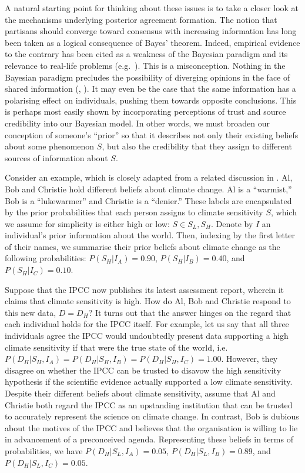 \documentclass[smallextended]{svjour3}       %
\begin{document}
A natural starting point for thinking about these issues is to take a
closer look at the mechanisms underlying posterior agreement formation.
The notion that partisans should converge toward consensus with
increasing information has long been taken as a logical consequence of
Bayes' theorem. Indeed, empirical evidence to the contrary has been
cited as a weakness of the Bayesian paradigm and its relevance to
real-life problems (e.g.~\cite{kahneman1972subjective}). This is a
misconception. Nothing in the Bayesian paradigm precludes the
possibility of diverging opinions in the face of shared information
(\cite{jaynes2003probability}, \cite{bullock2009partisan}). It may even
be the case that the same information has a polarising effect on
individuals, pushing them towards opposite conclusions. This is perhaps
most easily shown by incorporating perceptions of trust and source
credibility into our Bayesian model. In other words, we must broaden our
conception of someone's ``prior'' so that it describes not only their
existing beliefs about some phenomenon \(S\), but also the credibility
that they assign to different sources of information about \(S\).

Consider an example, which is closely adapted from a related discussion
in \cite{jaynes2003probability}. Al, Bob and Christie hold different
beliefs about climate change. Al is a ``warmist,'' Bob is a
``lukewarmer'' and Christie is a ``denier.'' These labels are
encapsulated by the prior probabilities that each person assigns to
climate sensitivity \(S\), which we assume for simplicity is either high
or low: \(S \in {S_L, S_H}\). Denote by \(I\) an individual's prior
information about the world. Then, indexing by the first letter of their
names, we summarise their prior beliefs about climate change as the
following probabilities: \(P(S_H|I_A)=0.90\), \(P(S_H|I_B)=0.40\), and
\(P(S_H|I_C)=0.10\).

Suppose that the IPCC now publishes its latest assessment report,
wherein it claims that climate sensitivity is high. How do Al, Bob and
Christie respond to this new data, \(D=D_H\)? It turns out that the
answer hinges on the regard that each individual holds for the IPCC
itself. For example, let us say that all three individuals agree the
IPCC would undoubtedly present data supporting a high climate
sensitivity if that were the true state of the world,
i.e.~\(P(D_H|S_H,I_A) = P(D_H|S_H,I_B) = P(D_H|S_H,I_C) = 1.00\).
However, they disagree on whether the IPCC can be trusted to disavow the
high sensitivity hypothesis if the scientific evidence actually
supported a low climate sensitivity. Despite their different beliefs
about climate sensitivity, assume that Al and Christie both regard the
IPCC as an upstanding institution that can be trusted to accurately
represent the science on climate change. In contrast, Bob is dubious
about the motives of the IPCC and believes that the organisation is
willing to lie in advancement of a preconceived agenda. Representing
these beliefs in terms of probabilities, we have
\(P(D_H|S_L,I_A) = 0.05\), \(P(D_H|S_L,I_B) = 0.89\), and
\(P(D_H|S_L,I_C) = 0.05\).
\end{document}
